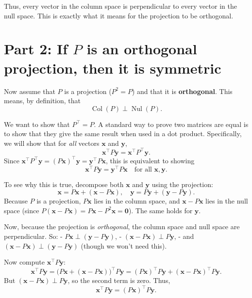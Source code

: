 \documentclass{article}
\begin{document}
Thus, every vector in the column space is perpendicular to every vector in the null space.  
This is exactly what it means for the projection to be orthogonal.

\section*{Part 2: If \( P \) is an orthogonal projection, then it is symmetric}

Now assume that \( P \) is a projection (\( P^2 = P \)) and that it is \textbf{orthogonal}.  
This means, by definition, that
\[
\operatorname{Col}(P) \perp \operatorname{Nul}(P).
\]

We want to show that \( P^\top = P \).  
A standard way to prove two matrices are equal is to show that they give the same result when used in a dot product. Specifically, we will show that for \textit{all} vectors \( \mathbf{x} \) and \( \mathbf{y} \),
\[
\mathbf{x}^\top P \mathbf{y} = \mathbf{x}^\top P^\top \mathbf{y}.
\]
Since \( \mathbf{x}^\top P^\top \mathbf{y} = (P\mathbf{x})^\top \mathbf{y} = \mathbf{y}^\top P \mathbf{x} \), this is equivalent to showing
\[
\mathbf{x}^\top P \mathbf{y} = \mathbf{y}^\top P \mathbf{x} \quad \text{for all } \mathbf{x}, \mathbf{y}.
\]

To see why this is true, decompose both \( \mathbf{x} \) and \( \mathbf{y} \) using the projection:
\[
\mathbf{x} = P\mathbf{x} + (\mathbf{x} - P\mathbf{x}), \quad
\mathbf{y} = P\mathbf{y} + (\mathbf{y} - P\mathbf{y}).
\]
Because \( P \) is a projection, \( P\mathbf{x} \) lies in the column space, and \( \mathbf{x} - P\mathbf{x} \) lies in the null space (since \( P(\mathbf{x} - P\mathbf{x}) = P\mathbf{x} - P^2\mathbf{x} = \mathbf{0} \)). The same holds for \( \mathbf{y} \).

Now, because the projection is \textit{orthogonal}, the column space and null space are perpendicular. So:
- \( P\mathbf{x} \perp (\mathbf{y} - P\mathbf{y}) \),
- \( (\mathbf{x} - P\mathbf{x}) \perp P\mathbf{y} \),
- and \( (\mathbf{x} - P\mathbf{x}) \perp (\mathbf{y} - P\mathbf{y}) \) (though we won’t need this).

Now compute \( \mathbf{x}^\top P \mathbf{y} \):
\[
\mathbf{x}^\top P \mathbf{y} = \big( P\mathbf{x} + (\mathbf{x} - P\mathbf{x}) \big)^\top P\mathbf{y}
= (P\mathbf{x})^\top P\mathbf{y} + (\mathbf{x} - P\mathbf{x})^\top P\mathbf{y}.
\]
But \( (\mathbf{x} - P\mathbf{x}) \perp P\mathbf{y} \), so the second term is zero. Thus,
\[
\mathbf{x}^\top P \mathbf{y} = (P\mathbf{x})^\top P\mathbf{y}.
\]
\end{document}
